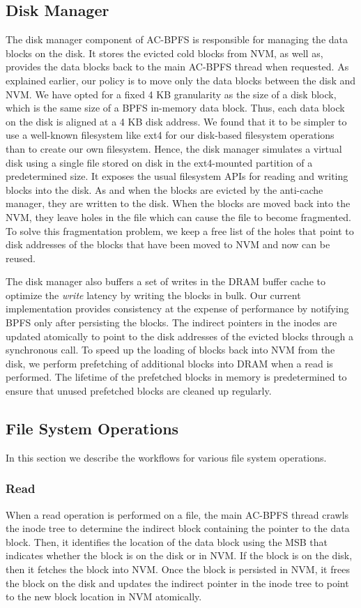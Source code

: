 \subsection{Disk Manager}
The disk manager component of AC-BPFS is responsible for managing the data blocks on the disk. It stores the evicted cold blocks from NVM, as well as, provides the data blocks back to the main AC-BPFS thread when requested. As explained earlier, our policy is to move only the data blocks between the disk and NVM. We have opted for a fixed 4 KB granularity as the size of a disk block, which is the same size of a BPFS in-memory data block. Thus, each data block on the disk is aligned at a 4 KB disk address. We found that it to be simpler to use a well-known filesystem like ext4 for our disk-based filesystem operations than to create our own filesystem. Hence, the disk manager simulates a virtual disk using a single file stored on disk in the ext4-mounted partition of a predetermined size. It exposes the usual filesystem APIs for reading and writing blocks into the disk. As and when the blocks are evicted by the anti-cache manager, they are written to the disk. When the blocks are moved back into the NVM, they leave holes in the file which can cause the file to become fragmented. To solve this fragmentation problem, we keep a free list of the holes that point to disk addresses of the blocks that have been moved to NVM and now can be reused.

The disk manager also buffers a set of writes in the DRAM buffer cache to optimize the \textit{write} latency by writing the blocks in bulk. Our current implementation provides consistency at the expense of performance by notifying BPFS only after persisting the blocks. The indirect pointers in the inodes are updated atomically to point to the disk addresses of the evicted blocks through a synchronous call. To speed up the loading of blocks back into NVM from the disk, we perform prefetching of additional blocks into DRAM when a read is performed. The lifetime of the prefetched blocks in memory is predetermined to ensure that unused prefetched blocks are cleaned up regularly.

\subsection{File System Operations}
In this section we describe the workflows for various file system operations.
\subsubsection{Read}
When a read operation is performed on a file, the main AC-BPFS thread crawls the inode tree to determine the indirect block containing the pointer to the data block. Then, it identifies the location of the data block using the MSB that indicates whether the block is on the disk or in NVM. If the block is on the disk, then it fetches the block into NVM. Once the block is persisted in NVM, it frees the block on the disk and updates the indirect pointer in the inode tree to point to the new block location in NVM atomically.

